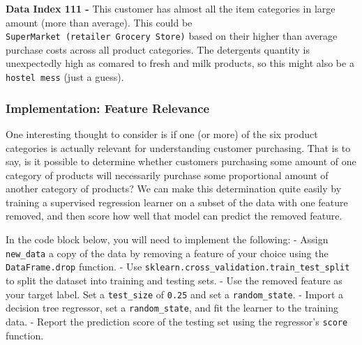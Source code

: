 \documentclass[11pt]{article}
\begin{document}
\textbf{Data Index 111 -} This customer has almost all the item
categories in large amount (more than average). This could be
\texttt{SuperMarket\ (retailer\ Grocery\ Store)} based on their higher
than average purchase costs across all product categories. The
detergents quantity is unexpectedly high as comared to fresh and milk
products, so this might also be a \texttt{hostel\ mess} (just a guess).

    \hypertarget{implementation-feature-relevance}{%
\subsubsection{Implementation: Feature
Relevance}\label{implementation-feature-relevance}}

One interesting thought to consider is if one (or more) of the six
product categories is actually relevant for understanding customer
purchasing. That is to say, is it possible to determine whether
customers purchasing some amount of one category of products will
necessarily purchase some proportional amount of another category of
products? We can make this determination quite easily by training a
supervised regression learner on a subset of the data with one feature
removed, and then score how well that model can predict the removed
feature.

In the code block below, you will need to implement the following: -
Assign \texttt{new\_data} a copy of the data by removing a feature of
your choice using the \texttt{DataFrame.drop} function. - Use
\texttt{sklearn.cross\_validation.train\_test\_split} to split the
dataset into training and testing sets. - Use the removed feature as
your target label. Set a \texttt{test\_size} of \texttt{0.25} and set a
\texttt{random\_state}. - Import a decision tree regressor, set a
\texttt{random\_state}, and fit the learner to the training data. -
Report the prediction score of the testing set using the regressor's
\texttt{score} function.
\end{document}
